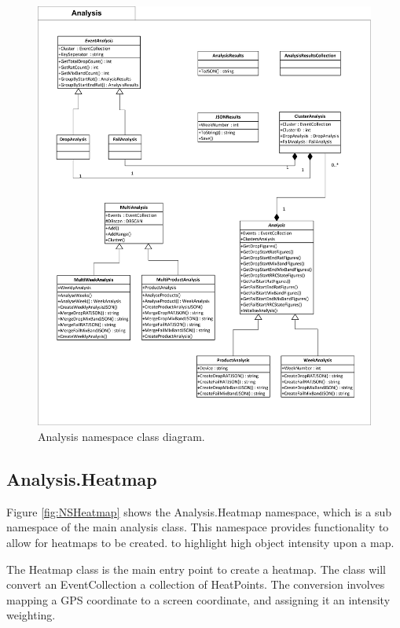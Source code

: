 \begin{figure}[H]
  \centering
    \includegraphics[scale=0.8]{chapter7/class_diagrams/analysis_namespace.png}
    \caption[Analysis namespace class diagram]
            {Analysis namespace class diagram.}
    \label{fig:NSAnalysis}
\end{figure}



\subsection{Analysis.Heatmap}
Figure \ref{fig:NSHeatmap} shows the Analysis.Heatmap namespace, which is a 
sub namespace of the main analysis class. This namespace provides functionality 
to allow for heatmaps to be created. to highlight high object intensity upon a 
map.

The Heatmap class is the main entry point to create a heatmap. The class will 
convert an EventCollection a collection of HeatPoints. The conversion involves 
mapping a GPS coordinate to a screen coordinate, and assigning it an intensity 
weighting. 

